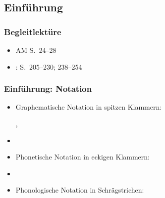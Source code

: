 
\nocite{Altmann&Co07a}
\nocite{DudenAussprache00a}
\nocite{Hall00a} 
\nocite{Kohler99a}
\nocite{Krech&Co09a}
\nocite{Pompino95a}
\nocite{Ramers08a}
\nocite{Ramers&Vater92a}
\nocite{Rues&Co07a}
\nocite{WieseR96a}
\nocite{WieseR11a}



\subsection{Einführung}

\begin{frame}
\frametitle{Begleitlektüre}
\begin{itemize}
	\item AM S.~24--28
	\item \citet[Kapitel~8]{Hall00a}:  S.~205--230; 238--254
\end{itemize}
\end{frame}


\begin{frame}
\frametitle{Einführung: Notation}


\begin{itemize}
	\item Graphematische Notation in spitzen Klammern: 
	
	  \ea
          , 
          \z
          
	\item[]	
	\item Phonetische Notation in eckigen Klammern:
	
	  \ea
          \textipa{[nO5t.vInt]}
	  \z
          
	\item[]
	\item Phonologische Notation in Schrägstrichen:
	
	  \ea
	  \z
\end{itemize}

\end{frame}



